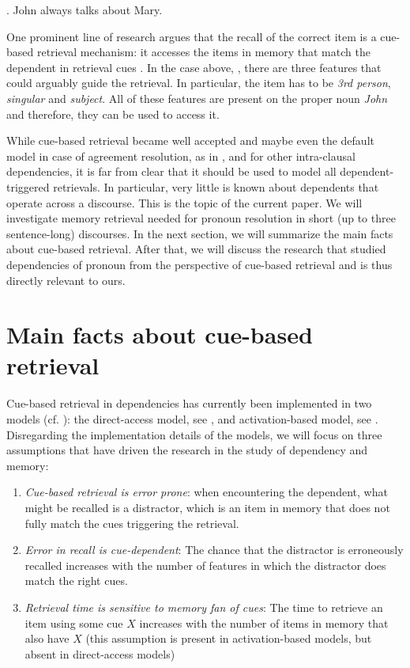 \documentclass[11pt]{article} %
\begin{document}
\ex. John always talks about Mary.

One prominent line of research argues that the recall of the correct item is a cue-based retrieval mechanism: it accesses the items in memory that match the dependent in retrieval cues \citep{mcelree00, dyke+03, mcelree+03, lewis+06, dyke07, vasishth+08, wagers+09, dillon+13, jager+17, nicenboim+18}. In the case above, \Last, there are three features that could arguably guide the retrieval. In particular, the item has to be \emph{3rd person}, \emph{singular} and \emph{subject}. All of these features are present on the proper noun \textit{John} and therefore, they can be used to access it.

While cue-based retrieval became well accepted and maybe even the default model in case of agreement resolution, as in \Last, and for other intra-clausal dependencies, it is far from clear that it should be used to model all dependent-triggered retrievals. In particular, very little is known about dependents that operate across a discourse. This is the topic of the current paper. We will investigate memory retrieval needed for pronoun resolution in short (up to three sentence-long) discourses. In the next section, we will summarize the main facts about cue-based retrieval. After that, we will discuss the research that studied dependencies of pronoun from the perspective of cue-based retrieval and is thus directly relevant to ours.

\section{Main facts about cue-based retrieval}
\label{sec_cuebased}

Cue-based retrieval in dependencies has currently been implemented in two models (cf. \citealt{nicenboim+18}): the direct-access model, see \cite{mcelree00}, and activation-based model, see \cite{lewis+05}. Disregarding the implementation details of the models, we will focus on three assumptions that have driven the research in the study of dependency and memory:

\begin{enumerate}
    \item \emph{Cue-based retrieval is error prone}: when encountering the dependent, what might be recalled is a distractor, which is an item in memory that does not fully match the cues triggering the retrieval.
    \item \emph{Error in recall is cue-dependent}: The chance that the distractor is erroneously recalled increases with the number of features in which the distractor does match the right cues.
    \item \emph{Retrieval time is sensitive to memory fan of cues}: The time to retrieve an item using some cue $X$ increases with the number of items in memory that also have $X$ (this assumption is present in activation-based models, but absent in direct-access models)
\end{enumerate}
            
\end{document}
